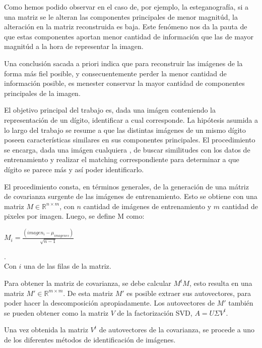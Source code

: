 Como hemos podido observar en el caso de, por ejemplo, la esteganograf\'ia, si a una matriz se le alteran
las componentes principales de menor magnit\'ud, la alteraci\'on en la matriz reconstruida es baja.
Este fen\'omeno nos da la pauta de que estas componentes aportan menor cantidad de informaci\'on
que las de mayor magnit\'ud a la hora de representar la imagen.

Una conclusi\'on sacada a priori indica que para reconstruir las im\'agenes de la forma m\'as fiel posible,
y consecuentemente perder la menor cantidad de informaci\'on posible, es menester conservar la mayor cantidad
de componentes principales de la imagen.

El objetivo principal del trabajo es, dada una im\'agen conteniendo la representaci\'on de un d\'igito,
identificar a cual corresponde. La hip\'otesis asumida a lo largo del trabajo se
resume a que las distintas im\'agenes de un mismo d\'igito poseen caracter\'isticas 
similares en sus componentes principales. El procedimiento se encarga, dada una im\'agen cualquiera
, de buscar similitudes con los datos de entrenamiento y realizar el matching correspondiente
para determinar a que d\'igito se parece m\'as y as\'i poder identificarlo.

El procedimiento consta, en t\'erminos generales, de la generaci\'on de una 
m\'atriz de covarianza surgente de las im\'agenes de entrenamiento. 
Esto se obtiene con una matriz $M \in \mathbb{R}^{n \times m}$, con $n$ cantidad
de im\'agenes de entrenamiento y $m$ cantidad de pixeles por imagen. Luego, se define M como:
\\

\centerline{$M_i = \frac{(imagen_i - \mu_{imagenes})}{\sqrt{n-1}}$}.
\\
Con $i$ una de las filas de la matriz.

Para obtener la matriz de covarianza, se debe calcular $M^t M$, esto resulta en una matriz $M' \in \mathbb{R}^{m \times m}$.
De esta matriz $M'$ es posible extraer sus autovectores, para poder hacer la descomposici\'on apropiadamente.
Los autovectores de $M'$ tambi\'en se pueden obtener como la matriz $V$ de la factorizaci\'on SVD, $A=U\Sigma V^t$.

Una vez obtenida la matriz $V^t$ de autovectores de la covarianza, se procede a uno de los diferentes m\'etodos de
identificaci\'on de im\'agenes.
